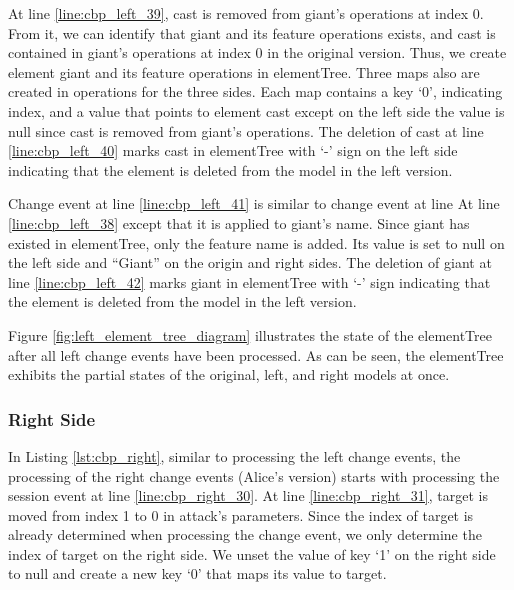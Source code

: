 At line \ref{line:cbp_left_39}, \textsf{cast} is removed from \textsf{giant}'s \textsf{operations} at index 0. From it, we can identify that \textsf{giant} and its feature \textsf{operations} exists, and \textsf{cast} is contained in \textsf{giant}'s \textsf{operations} at index 0 in the original version. Thus, we create element \textsf{giant} and its feature \textsf{operations} in \textsf{elementTree}. Three maps also are created in \textsf{operations} for the three sides. Each map contains a key `0', indicating index, and a value that points to element \textsf{cast} except on the left side the value is null since \textsf{cast} is removed from \textsf{giant}'s \textsf{operations}. The deletion of \textsf{cast} at line \ref{line:cbp_left_40} marks \textsf{cast} in \textsf{elementTree} with `-' sign on the left side indicating that the element is deleted from the model in the left version.

Change event at line \ref{line:cbp_left_41} is similar to change event at line At line \ref{line:cbp_left_38} except that it is applied to \textsf{giant}'s \textsf{name}. Since \textsf{giant} has existed in \textsf{elementTree}, only the feature \textsf{name} is added. Its value is set to null on the left side and ``Giant'' on the origin and right sides. The deletion of \textsf{giant} at line \ref{line:cbp_left_42} marks \textsf{giant} in \textsf{elementTree} with `-' sign indicating that the element is deleted from the model in the left version.

Figure \ref{fig:left_element_tree_diagram} illustrates the state of the \textsf{elementTree} after all left change events have been processed. As can be seen, the \textsf{elementTree} exhibits the partial states of the original, left, and right models at once. 

\subsubsection{Right Side}\label{sec:right_side}
In Listing \ref{lst:cbp_right}, similar to processing the left change events, the processing of the right change events (Alice's version) starts with processing the session event at line \ref{line:cbp_right_30}. At line \ref{line:cbp_right_31}, \textsf{target} is moved from index 1 to 0 in \textsf{attack}'s \textsf{parameters}. Since the index of \textsf{target} is already determined when processing the change event, we only determine the index of \textsf{target} on the right side. We unset the value of key `1' on the right side to null and create a new key `0' that maps its value to \textsf{target}.

